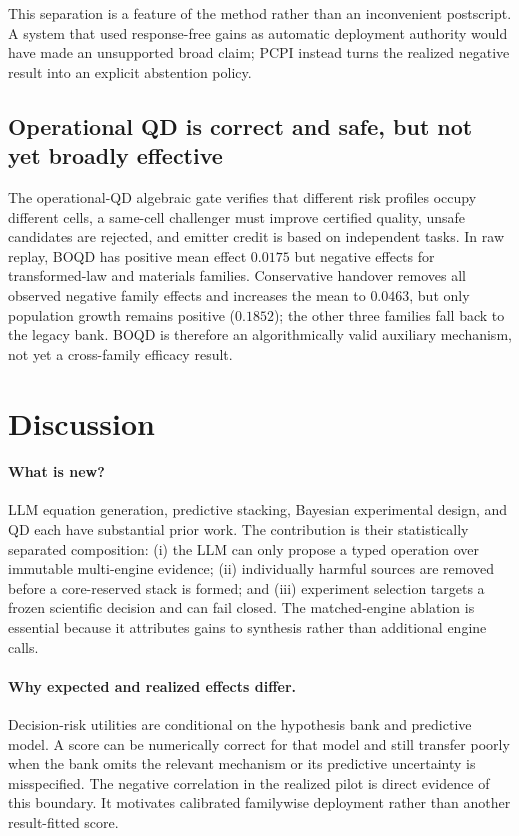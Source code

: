 \documentclass[twoside]{article}
\newcommand{\method}{PCPI}
\begin{document}
This separation is a feature of the method rather than an inconvenient
postscript. A system that used response-free gains as automatic deployment
authority would have made an unsupported broad claim; \method{} instead turns
the realized negative result into an explicit abstention policy.

\subsection{Operational QD is correct and safe, but not yet broadly effective}

The operational-QD algebraic gate verifies that different risk profiles occupy
different cells, a same-cell challenger must improve certified quality, unsafe
candidates are rejected, and emitter credit is based on independent tasks.
In raw replay, BOQD has positive mean effect \(0.0175\) but negative effects
for transformed-law and materials families. Conservative handover removes
all observed negative family effects and increases the mean to \(0.0463\), but
only population growth remains positive (\(0.1852\)); the other three families
fall back to the legacy bank. BOQD is therefore an algorithmically valid
auxiliary mechanism, not yet a cross-family efficacy result.

\section{Discussion}

\paragraph{What is new?}
LLM equation generation, predictive stacking, Bayesian experimental design,
and QD each have substantial prior work. The contribution is their
statistically separated composition: (i) the LLM can only propose a typed
operation over immutable multi-engine evidence; (ii) individually harmful
sources are removed before a core-reserved stack is formed; and (iii)
experiment selection targets a frozen scientific decision and can fail
closed. The matched-engine ablation is essential because it attributes gains
to synthesis rather than additional engine calls.

\paragraph{Why expected and realized effects differ.}
Decision-risk utilities are conditional on the hypothesis bank and predictive
model. A score can be numerically correct for that model and still transfer
poorly when the bank omits the relevant mechanism or its predictive
uncertainty is misspecified. The negative correlation in the realized pilot
is direct evidence of this boundary. It motivates calibrated familywise
deployment rather than another result-fitted score.
\end{document}
